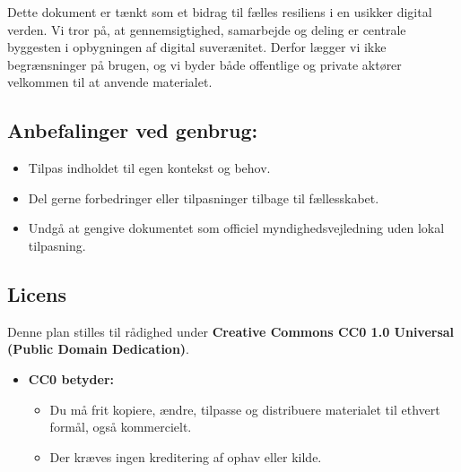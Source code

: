 \documentclass[a4paper,11pt,oneside]{book}
\def\tightlist{}
\begin{document}
Dette dokument er tænkt som et bidrag til fælles resiliens i en usikker
digital verden. Vi tror på, at gennemsigtighed, samarbejde og deling er
centrale byggesten i opbygningen af digital suverænitet. Derfor lægger
vi ikke begrænsninger på brugen, og vi byder både offentlige og private
aktører velkommen til at anvende materialet.

\subsection{Anbefalinger ved genbrug:}\label{anbefalinger-ved-genbrug}

\begin{itemize}
\tightlist
\item
  Tilpas indholdet til egen kontekst og behov.
\item
  Del gerne forbedringer eller tilpasninger tilbage til fællesskabet.
\item
  Undgå at gengive dokumentet som officiel myndighedsvejledning uden
  lokal tilpasning.
\end{itemize}

\subsection{Licens}\label{licens}

Denne plan stilles til rådighed under \textbf{Creative Commons CC0 1.0
Universal (Public Domain Dedication)}.

\begin{itemize}
\item
  \textbf{CC0 betyder:}

  \begin{itemize}
  \tightlist
  \item
    Du må frit kopiere, ændre, tilpasse og distribuere materialet til
    ethvert formål, også kommercielt.
  \item
    Der kræves ingen kreditering af ophav eller kilde.
  \end{itemize}
\end{itemize}
\end{document}
